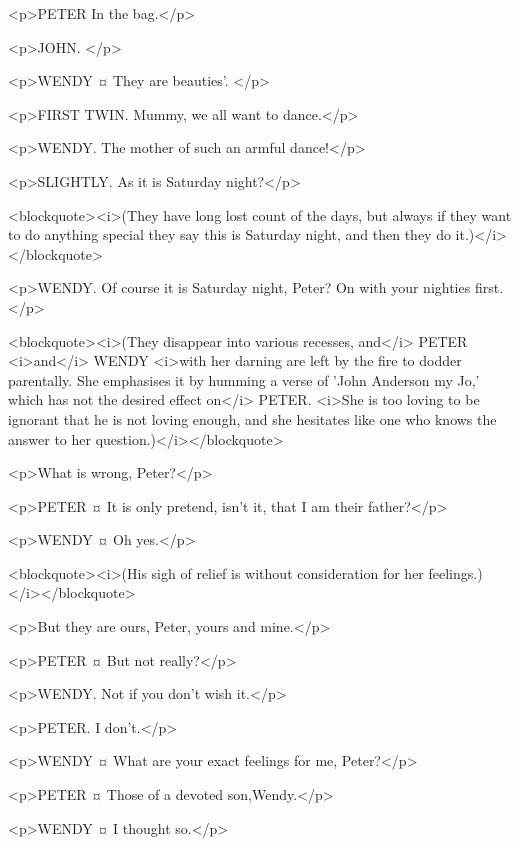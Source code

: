 <p>PETER
In the bag.</p>

<p>JOHN.
</p>

<p>WENDY ¤
They are beauties'.
</p>

<p>FIRST TWIN. Mummy, we all want to dance.</p>

<p>WENDY. The mother of such an armful dance!</p>

<p>SLIGHTLY. As it is Saturday night?</p>

<blockquote><i>(They have long lost count of the days, but always if they want to do anything special they say this is Saturday night, and then they do it.)</i></blockquote>

<p>WENDY. Of course it is Saturday night, Peter?
On with your nighties first.</p>

<blockquote><i>(They disappear into various recesses, and</i> PETER <i>and</i> WENDY <i>with her darning are left by the fire to dodder parentally. She emphasises it by humming a verse of 'John Anderson my Jo,' which has not the desired effect on</i> PETER. <i>She is too loving to be ignorant that he is not loving enough, and she hesitates like one who knows the answer to her question.)</i></blockquote>

<p>What is wrong, Peter?</p>

<p>PETER ¤
It is only pretend, isn't it, that I am their father?</p>

<p>WENDY ¤
Oh yes.</p>

<blockquote><i>(His sigh of relief is without consideration for her feelings.)</i></blockquote>

<p>But they are ours, Peter, yours and mine.</p>

<p>PETER ¤
But not really?</p>

<p>WENDY. Not if you don't wish it.</p>

<p>PETER. I don't.</p>

<p>WENDY ¤
What are your exact feelings for me, Peter?</p>

<p>PETER ¤
Those of a devoted son,Wendy.</p>

<p>WENDY ¤
I thought so.</p>


